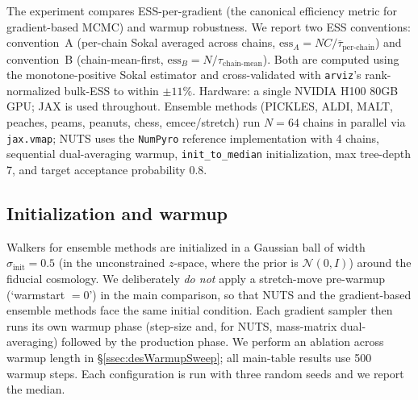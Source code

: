 \documentclass{article}
\newcommand{\gN}{\mathcal{N}}
\begin{document}
The experiment compares ESS-per-gradient (the canonical efficiency
metric for gradient-based MCMC) and warmup robustness. We report two
ESS conventions: convention~A (per-chain Sokal averaged across chains,
$\mathrm{ess}_A = N C / \overline{\tau}_{\text{per-chain}}$) and
convention~B (chain-mean-first, $\mathrm{ess}_B = N / \tau_{\text{chain-mean}}$).
Both are computed using the monotone-positive Sokal estimator and
cross-validated with \texttt{arviz}'s rank-normalized bulk-ESS
to within $\pm 11\%$. Hardware: a single NVIDIA H100 80GB GPU; JAX is
used throughout. Ensemble methods (PICKLES, ALDI, MALT, peaches, peams,
peanuts, chess, emcee/stretch) run $N=64$ chains in parallel via
\texttt{jax.vmap}; NUTS uses the \texttt{NumPyro} reference
implementation with 4 chains, sequential dual-averaging warmup,
\texttt{init\_to\_median} initialization, max tree-depth 7, and target
acceptance probability 0.8.

\subsection{Initialization and warmup}\label{ssec:desInit}

Walkers for ensemble methods are initialized in a Gaussian ball of
width $\sigma_{\text{init}}=0.5$ (in the unconstrained $z$-space, where
the prior is $\gN(0,I)$) around the fiducial cosmology. We deliberately
\emph{do not} apply a stretch-move pre-warmup (`warmstart $=0$') in the
main comparison, so that NUTS and the gradient-based ensemble methods
face the same initial condition. Each gradient sampler then runs its
own warmup phase (step-size and, for NUTS, mass-matrix dual-averaging)
followed by the production phase. We perform an ablation across warmup
length in \S\ref{ssec:desWarmupSweep}; all main-table results use 500
warmup steps. Each configuration is run with three random seeds and we
report the median.
\end{document}
